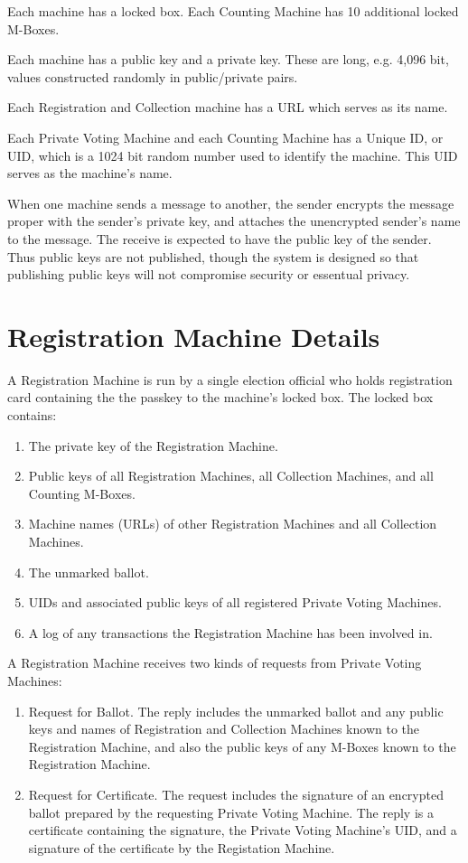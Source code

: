 \documentclass[12pt]{article}
\begin{document}
Each machine has a locked box.  Each Counting
Machine has 10 additional locked M-Boxes.

Each machine has a public key and a private key.  These
are long, e.g. 4,096 bit, values constructed randomly
in public/private pairs.

Each Registration and Collection
machine has a URL which serves as its name.

Each Private Voting Machine and each Counting Machine
has a Unique ID, or UID, which is a 1024 bit random number
used to identify the machine.  This UID serves as the
machine's name.

When one machine sends a message to another, the sender
encrypts the message proper with the sender's private
key, and attaches the unencrypted sender's name to the
message.  The receive is expected to have the public
key of the sender.  Thus public keys are not published,
though the system is designed so that publishing public
keys will not compromise security or essentual privacy.

\section{Registration Machine Details}

A Registration Machine is run by a single election official
who holds registration card containing the the passkey to
the machine's locked box.  The
locked box contains:
\begin{enumerate}
\item The private key of the Registration Machine.
\item Public keys of all Registration Machines, all Collection
Machines, and all Counting M-Boxes.
\item Machine names (URLs) of other Registration Machines and all Collection
Machines.
\item The unmarked ballot.
\item UIDs and associated public keys of all registered Private Voting
Machines.
\item A log of any transactions the Registration Machine has
been involved in.
\end{enumerate}

A Registration Machine receives two kinds of requests from
Private Voting Machines:
\begin{enumerate}

\item
Request for Ballot.  The reply includes the unmarked ballot
and any public keys and names of Registration and
Collection Machines known to the Registration Machine,
and also the public keys of any M-Boxes known to the Registration
Machine.

\item
Request for Certificate.  The request includes the signature
of an encrypted ballot prepared by the requesting Private
Voting Machine.  The reply is a certificate containing
the signature, the Private Voting Machine's UID,
and a signature of the certificate by the Registation Machine.

\end{enumerate}
\end{document}
